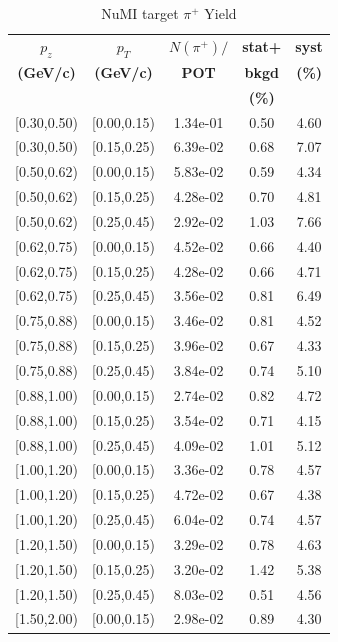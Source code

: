 \documentclass[%
aps, prd, reprint, show pacs, preprint numbers, ams math, amssymb, superscriptaddress, linenumbers]{revtex4-1}
\begin{document}
\begin{table}
\caption{NuMI target $\pi^+$ Yield}
\begin{tabular}{|c|c|c|c|c|}
\hline
\textbf{$p_z$} & \textbf{$p_T$} & \textbf{$N(\pi^+)/$} & \textbf{stat+} & \textbf{syst}\\
\textbf{(GeV/c)} &\textbf{(GeV/c)} & \textbf{POT}& \textbf{bkgd}& \textbf{(\%)}\\
& & & \textbf{(\%)} & \\
\hline

[0.30,0.50) & [0.00,0.15) & 1.34e-01 & 0.50 & 4.60 \\ 
 \hline
[0.30,0.50) & [0.15,0.25) & 6.39e-02 & 0.68 & 7.07 \\ 
 \hline
[0.50,0.62) & [0.00,0.15) & 5.83e-02 & 0.59 & 4.34 \\ 
 \hline
[0.50,0.62) & [0.15,0.25) & 4.28e-02 & 0.70 & 4.81 \\ 
 \hline
[0.50,0.62) & [0.25,0.45) & 2.92e-02 & 1.03 & 7.66 \\ 
 \hline
[0.62,0.75) & [0.00,0.15) & 4.52e-02 & 0.66 & 4.40 \\ 
 \hline
[0.62,0.75) & [0.15,0.25) & 4.28e-02 & 0.66 & 4.71 \\ 
 \hline
[0.62,0.75) & [0.25,0.45) & 3.56e-02 & 0.81 & 6.49 \\ 
 \hline
[0.75,0.88) & [0.00,0.15) & 3.46e-02 & 0.81 & 4.52 \\ 
 \hline
[0.75,0.88) & [0.15,0.25) & 3.96e-02 & 0.67 & 4.33 \\ 
 \hline
[0.75,0.88) & [0.25,0.45) & 3.84e-02 & 0.74 & 5.10 \\ 
 \hline
[0.88,1.00) & [0.00,0.15) & 2.74e-02 & 0.82 & 4.72 \\ 
 \hline
[0.88,1.00) & [0.15,0.25) & 3.54e-02 & 0.71 & 4.15 \\ 
 \hline
[0.88,1.00) & [0.25,0.45) & 4.09e-02 & 1.01 & 5.12 \\ 
 \hline
[1.00,1.20) & [0.00,0.15) & 3.36e-02 & 0.78 & 4.57 \\ 
 \hline
[1.00,1.20) & [0.15,0.25) & 4.72e-02 & 0.67 & 4.38 \\ 
 \hline
[1.00,1.20) & [0.25,0.45) & 6.04e-02 & 0.74 & 4.57 \\ 
 \hline
[1.20,1.50) & [0.00,0.15) & 3.29e-02 & 0.78 & 4.63 \\ 
 \hline
[1.20,1.50) & [0.15,0.25) & 3.20e-02 & 1.42 & 5.38 \\ 
 \hline
[1.20,1.50) & [0.25,0.45) & 8.03e-02 & 0.51 & 4.56 \\ 
 \hline
[1.50,2.00) & [0.00,0.15) & 2.98e-02 & 0.89 & 4.30 \\ 

\end{tabular}
\end{table}
\end{document}
